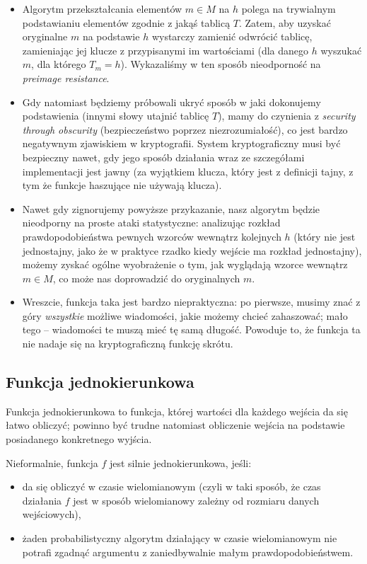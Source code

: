 \documentclass[12pt,a4paper,twoside]{article}
\begin{document}
\begin{itemize}
\item Algorytm przekształcania elementów $m \in M$ na $h$ polega na trywialnym
podstawianiu elementów zgodnie z jakąś tablicą $T$. Zatem, aby uzyskać
oryginalne $m$ na podstawie $h$ wystarczy zamienić odwrócić tablicę,
zamieniając jej klucze z przypisanymi im wartościami (dla danego $h$ wyszukać
$m$, dla którego $T_m = h$). Wykazaliśmy w ten sposób nieodporność na
\textit{preimage resistance}.
\item Gdy natomiast będziemy próbowali ukryć sposób w jaki dokonujemy
podstawienia (innymi słowy utajnić tablicę $T$), mamy do czynienia z
\textit{security through obscurity} (bezpieczeństwo poprzez niezrozumiałość),
co jest bardzo negatywnym zjawiskiem w kryptografii. System kryptograficzny
musi być bezpieczny nawet, gdy jego sposób działania wraz ze szczegółami
implementacji jest jawny (za wyjątkiem klucza, który jest z definicji tajny, z
tym że funkcje haszujące nie używają klucza).
\item Nawet gdy zignorujemy powyższe przykazanie, nasz algorytm będzie
nieodporny na proste ataki statystyczne: analizując rozkład prawdopodobieństwa
pewnych wzorców wewnątrz kolejnych $h$ (który nie jest jednostajny, jako że w
praktyce rzadko kiedy wejście ma rozkład jednostajny), możemy zyskać ogólne
wyobrażenie o tym, jak wyglądają wzorce wewnątrz $m \in M$, co może nas
doprowadzić do oryginalnych $m$.
\item Wreszcie, funkcja taka jest bardzo niepraktyczna: po pierwsze, musimy
znać z góry \emph{wszystkie} możliwe wiadomości, jakie możemy chcieć
zahaszować; mało tego -- wiadomości te muszą mieć tę samą długość. Powoduje to,
że funkcja ta nie nadaje się na kryptograficzną funkcję skrótu.
\end{itemize}

\subsection{Funkcja jednokierunkowa}
Funkcja jednokierunkowa to funkcja, której wartości dla każdego wejścia da się
łatwo obliczyć; powinno być trudne natomiast obliczenie wejścia na podstawie
posiadanego konkretnego wyjścia.

\noindent
Nieformalnie, funkcja $f$ jest silnie jednokierunkowa, jeśli:
\begin{itemize}
\item da się obliczyć w czasie wielomianowym (czyli w taki sposób, że czas
działania $f$ jest w sposób wielomianowy zależny od rozmiaru danych
wejściowych),
\item żaden probabilistyczny algorytm działający w czasie wielomianowym nie
potrafi zgadnąć argumentu z zaniedbywalnie małym prawdopodobieństwem.
\end{itemize}
\end{document}
